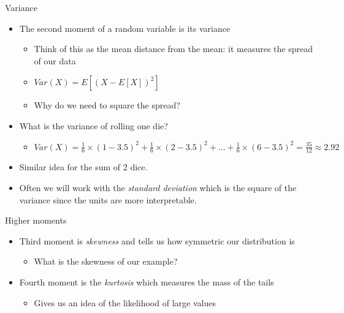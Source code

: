 \documentclass[aspectratio=169]{beamer}
\begin{document}
\begin{frame}{Variance}
    \begin{itemize}
        \item The second moment of a random variable is its variance
        \begin{itemize}
            \item Think of this as the mean distance from the mean: it measures the spread of our data
            \item $Var(X) = E \left[ (X - E[X])^2 \right] $
            \item Why do we need to square the spread?
        \end{itemize}
        \item What is the variance of rolling one die?
        \begin{itemize}
            \item $Var(X) = \frac{1}{6} \times (1 - 3.5)^2 + \frac{1}{6} \times (2 - 3.5)^2 + \dots + \frac{1}{6} \times (6 - 3.5)^2 = \frac{35}{12} \approx 2.92$
        \end{itemize}
        \item Similar idea for the sum of 2 dice.
        \item Often we will work with the \textit{standard deviation} which is the square of the variance since the units are more interpretable.
    \end{itemize}
\end{frame}

\begin{frame}{Higher moments}
    \begin{itemize}
        \item Third moment is \textit{skewness} and tells us how symmetric our distribution is
        \begin{itemize}
            \item What is the skewness of our example?
        \end{itemize}
        \item Fourth moment is the \textit{kurtosis} which measures the mass of the tails
        \begin{itemize}
            \item Gives us an idea of the likelihood of large values
        \end{itemize}
    \end{itemize}
\end{frame}
\end{document}
